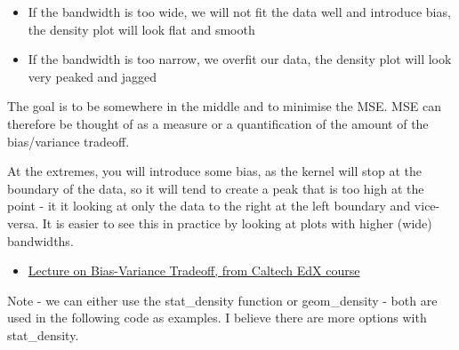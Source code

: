 \documentclass[]{book}
\providecommand{\tightlist}{%
  \setlength{\itemsep}{0pt}\setlength{\parskip}{0pt}}
\theoremstyle{definition}
\theoremstyle{definition}
\theoremstyle{definition}
\theoremstyle{remark}
\begin{document}
\begin{itemize}
\tightlist
\item
  If the bandwidth is too wide, we will not fit the data well and
  introduce bias, the density plot will look flat and smooth
\item
  If the bandwidth is too narrow, we overfit our data, the density plot
  will look very peaked and jagged
\end{itemize}

The goal is to be somewhere in the middle and to minimise the MSE. MSE
can therefore be thought of as a measure or a quantification of the
amount of the bias/variance tradeoff.

At the extremes, you will introduce some bias, as the kernel will stop
at the boundary of the data, so it will tend to create a peak that is
too high at the point - it it looking at only the data to the right at
the left boundary and vice-versa. It is easier to see this in practice
by looking at plots with higher (wide) bandwidths.

\begin{itemize}
\tightlist
\item
  \href{https://www.youtube.com/watch?v=zrEyxfl2-a8}{Lecture on
  Bias-Variance Tradeoff, from Caltech EdX course}
\end{itemize}

Note - we can either use the stat\_density function or geom\_density -
both are used in the following code as examples. I believe there are
more options with stat\_density.
\end{document}
